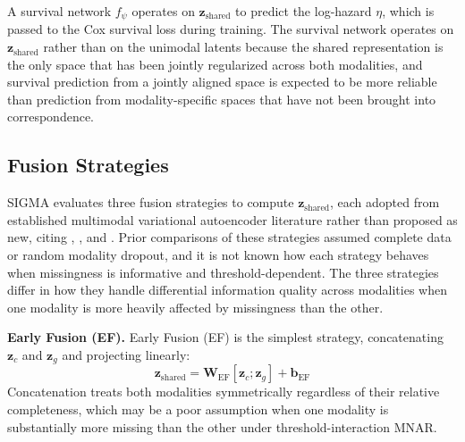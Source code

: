 \documentclass[final,3p,times,authoryear]{elsarticle}
\begin{document}
A survival network $f_\psi$ operates on $\mathbf{z}_{\text{shared}}$ to predict the log-hazard $\eta$, which is passed to the Cox survival loss during training. The survival network operates on $\mathbf{z}_{\text{shared}}$ rather than on the unimodal latents because the shared representation is the only space that has been jointly regularized across both modalities, and survival prediction from a jointly aligned space is expected to be more reliable than prediction from modality-specific spaces that have not been brought into correspondence.

\subsection{Fusion Strategies}
SIGMA evaluates three fusion strategies to compute $\mathbf{z}_{\text{shared}}$, each adopted from established multimodal variational autoencoder literature rather than proposed as new, citing \citet{chang2025myevae}, \citet{li2023mavae}, and \citet{wu2018multimodal}. Prior comparisons of these strategies assumed complete data or random modality dropout, and it is not known how each strategy behaves when missingness is informative and threshold-dependent. The three strategies differ in how they handle differential information quality across modalities when one modality is more heavily affected by missingness than the other.

\textbf{Early Fusion (EF).} Early Fusion (EF) is the simplest strategy, concatenating $\mathbf{z}_c$ and $\mathbf{z}_g$ and projecting linearly:
\begin{equation}
\mathbf{z}_{\text{shared}} = \mathbf{W}_{\text{EF}}[\mathbf{z}_c ; \mathbf{z}_g] + \mathbf{b}_{\text{EF}}
\label{eq:ef}
\end{equation}
Concatenation treats both modalities symmetrically regardless of their relative completeness, which may be a poor assumption when one modality is substantially more missing than the other under threshold-interaction MNAR.
\end{document}
